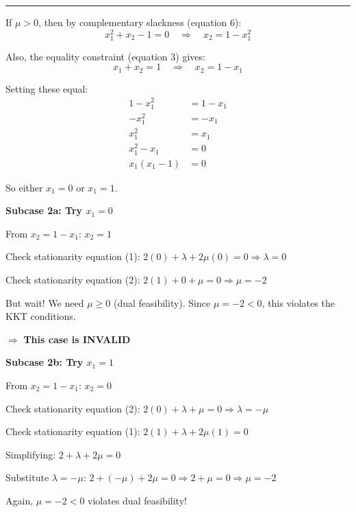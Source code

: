\documentclass[11pt]{article}
\begin{document}
\noindent\rule{\textwidth}{0.4pt}

If $\mu > 0$, then by complementary slackness (equation 6):
\begin{equation*}
x_1^2 + x_2 - 1 = 0 \quad \Rightarrow \quad x_2 = 1 - x_1^2
\end{equation*}

Also, the equality constraint (equation 3) gives:
\begin{equation*}
x_1 + x_2 = 1 \quad \Rightarrow \quad x_2 = 1 - x_1
\end{equation*}

Setting these equal:
\begin{align*}
1 - x_1^2 &= 1 - x_1\\
-x_1^2 &= -x_1\\
x_1^2 &= x_1\\
x_1^2 - x_1 &= 0\\
x_1(x_1 - 1) &= 0
\end{align*}

So either $x_1 = 0$ or $x_1 = 1$.

\vspace{0.5em}

\textbf{Subcase 2a: Try $x_1 = 0$}

From $x_2 = 1 - x_1$: $x_2 = 1$

Check stationarity equation (1): $2(0) + \lambda + 2\mu(0) = 0 \Rightarrow \lambda = 0$

Check stationarity equation (2): $2(1) + 0 + \mu = 0 \Rightarrow \mu = -2$

But wait! We need $\mu \geq 0$ (dual feasibility). Since $\mu = -2 < 0$, this violates the KKT conditions.

$\Rightarrow$ \textbf{This case is INVALID}

\vspace{0.5em}

\textbf{Subcase 2b: Try $x_1 = 1$}

From $x_2 = 1 - x_1$: $x_2 = 0$

Check stationarity equation (2): $2(0) + \lambda + \mu = 0 \Rightarrow \lambda = -\mu$

Check stationarity equation (1): $2(1) + \lambda + 2\mu(1) = 0$

Simplifying: $2 + \lambda + 2\mu = 0$

Substitute $\lambda = -\mu$: $2 + (-\mu) + 2\mu = 0 \Rightarrow 2 + \mu = 0 \Rightarrow \mu = -2$

Again, $\mu = -2 < 0$ violates dual feasibility!
\end{document}

